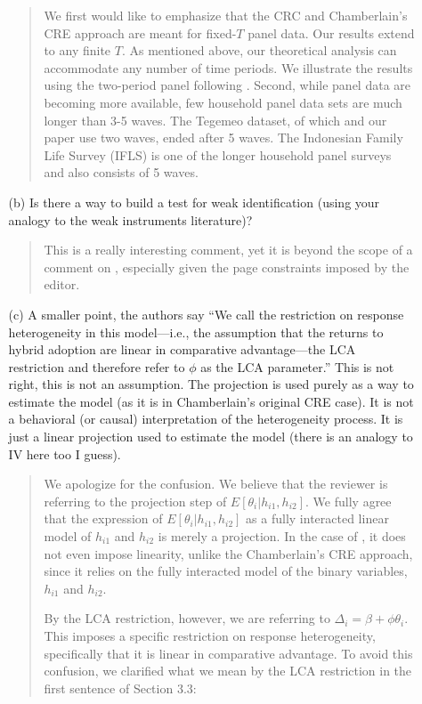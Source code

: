 \documentclass{article}[11pt]
\begin{document}
\begin{enumerate}
\begin{itemize}
\begin{quote}
    We first would like to emphasize that the CRC and Chamberlain's CRE approach are meant for fixed-$T$ panel data. Our results extend to any finite $T$.     
    As mentioned above, our theoretical analysis can accommodate any number of time periods. We illustrate the results using the two-period panel following \citet{S2011}. 
    Second, while panel data are becoming more available, few household panel data sets are much longer than 3-5 waves. 
    The Tegemeo dataset, of which \cite{S2011} and our paper use two waves, ended after 5 waves. 
    The Indonesian Family Life Survey (IFLS) is one of the longer household panel surveys and also consists of 5 waves. 
    \end{quote}
    \item[(b)] Is there a way to build a test for weak identification (using your analogy to the weak instruments literature)?
    \begin{quote}        
    This is a really interesting comment, yet it is beyond the scope of a comment on \citet{S2011}, especially given the page constraints imposed by the editor.
    \end{quote}
    \item[(c)] A smaller point, the authors say ``We call the restriction on response heterogeneity in this model—i.e., the assumption that the returns to hybrid adoption are linear in comparative advantage—the LCA restriction and therefore refer to $\phi$ as the LCA parameter.'' This is not right, this is not an assumption. The projection is used purely as a way to estimate the model (as it is in Chamberlain’s original CRE case). It is not a behavioral (or causal) interpretation of the heterogeneity process. It is just a linear projection used to estimate the model (there is an analogy to IV here too I guess).
    \begin{quote}
    We apologize for the confusion. We believe that the reviewer is referring to the projection step of $E[\theta_i|h_{i1},h_{i2}]$. We fully agree that the expression of $E[\theta_i|h_{i1},h_{i2}]$ as a fully interacted linear model of $h_{i1}$ and $h_{i2}$ is merely a projection. In the case of \citet{S2011}, it does not even impose linearity, unlike the Chamberlain's CRE approach, since it relies on the fully interacted model of the binary variables, $h_{i1}$ and $h_{i2}$.\newline  
    
    By the LCA restriction, however, we are referring to $\Delta_i=\beta +\phi \theta_i$. This imposes a specific restriction on response heterogeneity, specifically that it is linear in comparative advantage. To avoid this confusion, we clarified what we mean by the LCA restriction in the first sentence of Section 3.3:


\end{quote}
\end{itemize}
\end{enumerate}
\end{document}
